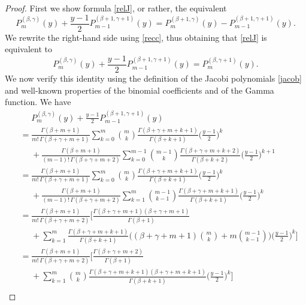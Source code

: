 \documentclass[10pt,a4paper]{amsart}
\begin{document}
\begin{proof}
First we show formula \eqref{relJ}, or rather, the equivalent
	\begin{equation*}
		\label{relJ1}
		P_m^{(\beta, \gamma)}(y)+ \frac{y-1}{2}P_{m-1}^{(\beta+1, \gamma+1)}(y)=P^{(\beta+1, \gamma)}_m(y)-P^{(\beta+1, \gamma+1)}_{m-1}(y).
	\end{equation*}
	We rewrite the right-hand side using \eqref{recc}, thus obtaining that \eqref{relJ} is equivalent to
	\begin{equation*}
		P_m^{(\beta, \gamma)}(y)+ \frac{y-1}{2}P_{m-1}^{(\beta+1, \gamma+1)}(y)=P^{(\beta, \gamma+1)}_{m}(y).
	\end{equation*}
	We now verify this identity using the definition of the Jacobi polynomials \eqref{jacob} and well-known properties of the binomial coefficients and of the Gamma function. We have
			\begingroup\allowdisplaybreaks
	\begin{align*}
		&\phantom{=}P_m^{(\beta, \gamma)}(y)+ \frac{y-1}{2}P_{m-1}^{(\beta+1, \gamma+1)}(y)\\
		&= \frac{\Gamma(\beta+m+1)}{m!\,\Gamma(\beta+\gamma+m+1)} \sum_{k=0}^{m} \binom{m}{k} \frac{\Gamma(\beta+\gamma+m+k+1)}{\Gamma(\beta+k+1)} \bigg(\frac{y-1}{2}\bigg)^{k}\\
		&\phantom{=}+\frac{\Gamma(\beta+m+1)}{(m-1)!\, \Gamma(\beta+\gamma+m+2)} \sum_{k=0}^{m-1} \binom{m-1}{k} \frac{\Gamma(\beta+\gamma+m+k+2)}{\Gamma(\beta+k+2)} \bigg(\frac{y-1}{2}\bigg)^{k+1}\\
		&=\frac{\Gamma(\beta+m+1)}{m!\,\Gamma(\beta+\gamma+m+1)} \sum_{k=0}^{m} \binom{m}{k} \frac{\Gamma(\beta+\gamma+m+k+1)}{\Gamma(\beta+k+1)} \bigg(\frac{y-1}{2}\bigg)^{k}\\
		&\phantom{=} +\frac{\Gamma(\beta+m+1)}{(m-1)!\, \Gamma(\beta+\gamma+m+2)}\sum_{k=1}^{m} \binom{m-1}{k-1} \frac{\Gamma(\beta+\gamma+m+k+1)}{\Gamma(\beta+k+1)} \bigg(\frac{y-1}{2}\bigg)^{k}\\
		&= \frac{\Gamma(\beta+m+1)}{m!\, \Gamma(\beta+\gamma+m+2)}\bigg[  \frac{\Gamma(\beta+\gamma+m+1)(\beta+\gamma+m+1)}{\Gamma(\beta+1)}\\
		&\phantom{=} +\sum_{k=1}^m \frac{\Gamma(\beta+\gamma+m+k+1)}{\Gamma(\beta+k+1)} \bigg( (\beta+\gamma+m+1)\binom{m}{k}+m \binom{m-1}{k-1}\bigg) \bigg(\frac{y-1}{2}\bigg)^{k}\bigg] \\
		&= \frac{\Gamma(\beta+m+1)}{m! \, \Gamma(\beta+\gamma+m+2)} \bigg[ \frac{\Gamma(\beta+\gamma+m+2)}{ \Gamma(\beta+1)} \\
		&\phantom{=}+\sum_{k=1}^m \binom{m}{k} \frac{\Gamma(\beta+\gamma+m+k+1)(\beta+\gamma+m+k+1)}{\Gamma(\beta+k+1)}\bigg(\frac{y-1}{2}\bigg)^{k} \bigg]\\

\end{align*}
\end{proof}
\end{document}
